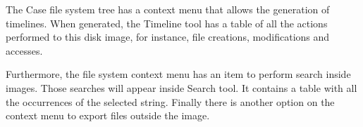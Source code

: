 The Case file system tree has a context menu that allows the generation of
timelines. When generated, the Timeline tool has a table of all the actions 
performed to this disk image, for instance, file creations, modifications and
accesses.

Furthermore, the file system context menu has an item to perform search inside
images. Those searches will appear inside Search tool. It contains a table
with all the occurrences of the selected string. Finally there is another
option on the context menu to export files outside the image.

